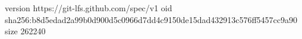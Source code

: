 version https://git-lfs.github.com/spec/v1
oid sha256:b8d5edad2a99b0d900d5c0966d7dd4c9150de15dad432913c576ff5457cc9a90
size 262240
